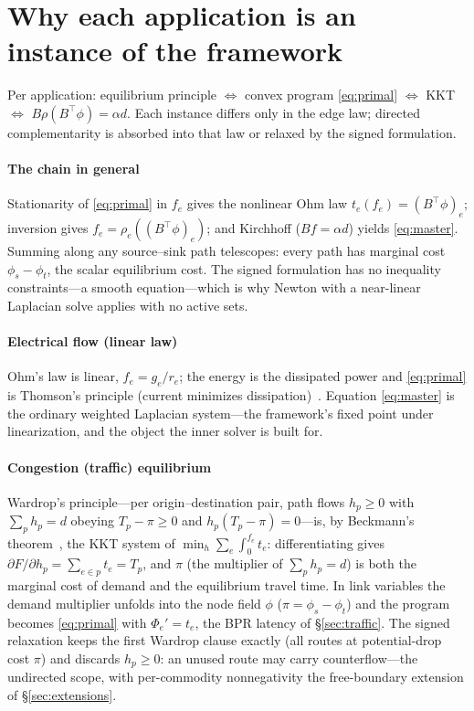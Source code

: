 \documentclass{siamart220329}
\begin{document}
\appendix
\section{Why each application is an instance of the framework}\label{app:instances}
Per application: equilibrium principle $\Leftrightarrow$ convex program \eqref{eq:primal}
$\Leftrightarrow$ KKT $\Leftrightarrow$ $B\rho(B^{\top}\phi)=\alpha d$.
Each instance differs only in the edge law; directed complementarity is absorbed into that law or
relaxed by the signed formulation.

\paragraph{The chain in general} Stationarity of \eqref{eq:primal} in $f_e$ gives the nonlinear
Ohm law $t_e(f_e)=(B^{\top}\phi)_e$; inversion gives $f_e=\rho_e((B^{\top}\phi)_e)$; and
Kirchhoff ($Bf=\alpha d$) yields \eqref{eq:master}. Summing along any source--sink path telescopes:
every path has marginal cost $\phi_s-\phi_t$, the scalar equilibrium cost. The signed formulation
has no inequality constraints---a smooth equation---which is why Newton with a near-linear Laplacian
solve applies with no active sets.

\paragraph{Electrical flow (linear law)} Ohm's law is linear, $f_e=g_e/r_e$; the energy is the
dissipated power and \eqref{eq:primal} is Thomson's principle (current minimizes
dissipation)~\cite{doyle-snell}. Equation \eqref{eq:master} is the ordinary weighted Laplacian
system---the framework's fixed point under linearization, and the object the inner solver
\cite{lamgplus} is built for.

\paragraph{Congestion (traffic) equilibrium} Wardrop's principle---per origin--destination pair,
path flows $h_p\ge0$ with $\sum_p h_p=d$ obeying $T_p-\pi\ge0$ and $h_p(T_p-\pi)=0$---is, by
Beckmann's theorem~\cite{beckmann}, the KKT system of $\min_h\sum_e\int_0^{f_e}t_e$: differentiating
gives $\partial F/\partial h_p=\sum_{e\in p}t_e=T_p$, and $\pi$ (the multiplier of $\sum_p h_p=d$) is
both the marginal cost of demand and the equilibrium travel time. In link variables the demand
multiplier unfolds into the node field $\phi$ ($\pi=\phi_s-\phi_t$) and the program becomes
\eqref{eq:primal} with $\Phi_e'=t_e$, the BPR latency of \S\ref{sec:traffic}. The signed relaxation
keeps the first Wardrop clause exactly (all routes at potential-drop cost $\pi$) and discards
$h_p\ge0$: an unused route may carry counterflow---the undirected scope, with per-commodity
nonnegativity the free-boundary extension of \S\ref{sec:extensions}.
\end{document}
